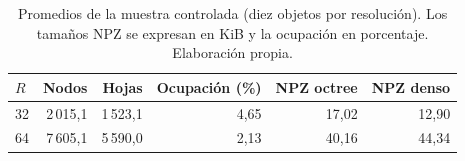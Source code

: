 \begin{table}[htbp]\centering\small
\caption{Promedios de la muestra controlada (diez objetos por resolución). Los tamaños NPZ se expresan en KiB y la ocupación en porcentaje. Elaboración propia.}\label{tab:geometria-resultados}
\setlength{\tabcolsep}{4pt}
\begin{tabular}{@{}lrrrrr@{}}\toprule
$R$ & Nodos & Hojas & Ocupación (\%) & NPZ octree & NPZ denso \\\midrule
32 & 2\,015,1 & 1\,523,1 & 4,65 & 17,02 & 12,90 \\
64 & 7\,605,1 & 5\,590,0 & 2,13 & 40,16 & 44,34 \\
\bottomrule\end{tabular}\end{table}
